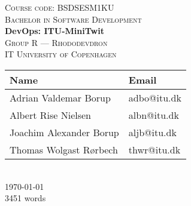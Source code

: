 \newcommand{\HRule}{\rule{1.25\linewidth}{0.5mm}}
\center
\vspace*{-4.35cm}
%
\vspace{3cm}
\textsc{\large Course code: BSDSESM1KU}
\\[0.2cm]
\textsc{\large Bachelor in Software Development}
\\[0.5cm]
\hbox{\makebox[1\textwidth][c]{\HRule}}
\vspace{0.4cm}
{ \huge \bfseries DevOps: ITU-MiniTwit}
\\[0.6cm]
\hbox{\makebox[1\textwidth][c]{\HRule}}
\vspace{0.9cm}
\textsc{\Large Group R --- Rhododevdron\\[0.5cm]IT University of Copenhagen}\\[1.5cm]
\begin{tabular}{ll}
\toprule
\textbf{Name} & \textbf{Email} \\
\midrule
Adrian Valdemar Borup & adbo@itu.dk \\
Albert Rise Nielsen & albn@itu.dk \\
Joachim Alexander Borup & aljb@itu.dk \\
Thomas Wolgast Rørbech & thwr@itu.dk \\
\bottomrule
\end{tabular}
\\[2cm]
{\large \today}
\\[1.5cm]
{\large 3451 words}
\vfill
